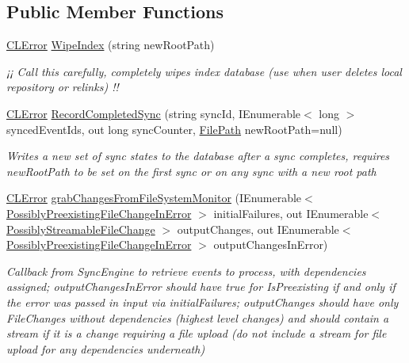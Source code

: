 \subsection*{Public Member Functions}
\begin{DoxyCompactItemize}
\item 
\hyperlink{class_cloud_api_public_1_1_model_1_1_c_l_error}{C\-L\-Error} \hyperlink{interface_cloud_api_public_1_1_interfaces_1_1_i_sync_data_object_a817534319f57345b85736142e5b36b44}{Wipe\-Index} (string new\-Root\-Path)
\begin{DoxyCompactList}\small\item\em ¡¡ Call this carefully, completely wipes index database (use when user deletes local repository or relinks) !! \end{DoxyCompactList}\item 
\hyperlink{class_cloud_api_public_1_1_model_1_1_c_l_error}{C\-L\-Error} \hyperlink{interface_cloud_api_public_1_1_interfaces_1_1_i_sync_data_object_a77804f09d03674f67d7808a4cfd09b25}{Record\-Completed\-Sync} (string sync\-Id, I\-Enumerable$<$ long $>$ synced\-Event\-Ids, out long sync\-Counter, \hyperlink{class_cloud_api_public_1_1_model_1_1_file_path}{File\-Path} new\-Root\-Path=null)
\begin{DoxyCompactList}\small\item\em Writes a new set of sync states to the database after a sync completes, requires new\-Root\-Path to be set on the first sync or on any sync with a new root path \end{DoxyCompactList}\item 
\hyperlink{class_cloud_api_public_1_1_model_1_1_c_l_error}{C\-L\-Error} \hyperlink{interface_cloud_api_public_1_1_interfaces_1_1_i_sync_data_object_a137b9a4ce8e5ec066bd55933d9d4ed2f}{grab\-Changes\-From\-File\-System\-Monitor} (I\-Enumerable$<$ \hyperlink{struct_cloud_api_public_1_1_model_1_1_possibly_preexisting_file_change_in_error}{Possibly\-Preexisting\-File\-Change\-In\-Error} $>$ initial\-Failures, out I\-Enumerable$<$ \hyperlink{struct_cloud_api_public_1_1_model_1_1_possibly_streamable_file_change}{Possibly\-Streamable\-File\-Change} $>$ output\-Changes, out I\-Enumerable$<$ \hyperlink{struct_cloud_api_public_1_1_model_1_1_possibly_preexisting_file_change_in_error}{Possibly\-Preexisting\-File\-Change\-In\-Error} $>$ output\-Changes\-In\-Error)
\begin{DoxyCompactList}\small\item\em Callback from Sync\-Engine to retrieve events to process, with dependencies assigned; output\-Changes\-In\-Error should have true for Is\-Preexisting if and only if the error was passed in input via initial\-Failures; output\-Changes should have only File\-Changes without dependencies (highest level changes) and should contain a stream if it is a change requiring a file upload (do not include a stream for file upload for any dependencies underneath) \end{DoxyCompactList}\item 

\end{DoxyCompactItemize}
